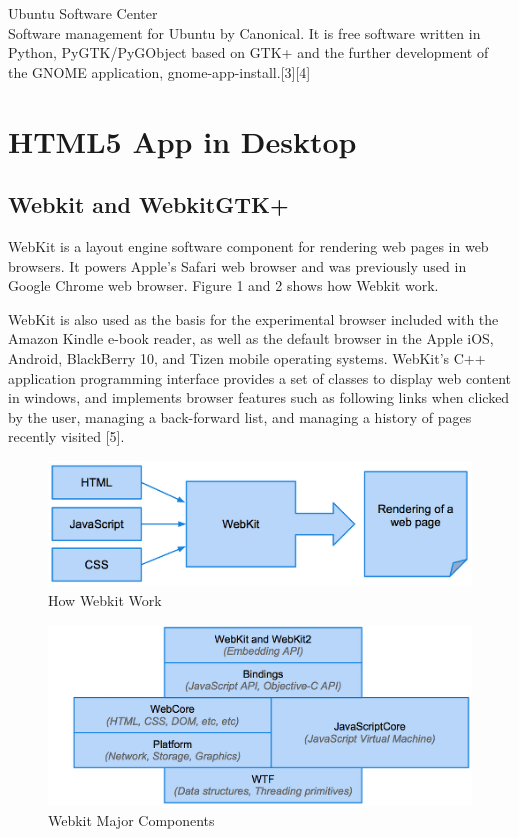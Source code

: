 \documentclass[conference, letterpaper]{IEEEtran}
\begin{document}
Ubuntu Software Center\\Software management for Ubuntu by Canonical. It is free software written in Python, PyGTK/PyGObject based on GTK+ and the further development of the GNOME application, gnome-app-install.[3][4]

\section{HTML5 App in Desktop}

\subsection{Webkit and WebkitGTK+}
WebKit is a layout engine software component for rendering web pages in web browsers. It powers Apple's Safari web browser and was previously used in Google Chrome web browser. Figure 1 and 2 shows how Webkit work.

WebKit is also used as the basis for the experimental browser included with the Amazon Kindle e-book reader, as well as the default browser in the Apple iOS, Android, BlackBerry 10, and Tizen mobile operating systems. WebKit's C++ application programming interface provides a set of classes to display web content in windows, and implements browser features such as following links when clicked by the user, managing a back-forward list, and managing a history of pages recently visited [5].

\begin{figure}[!t]
\centering
\includegraphics[scale=0.5]{image/webkit.png}
\caption{How Webkit Work}
\end{figure}

\begin{figure}[!t]
\centering
\includegraphics[scale=0.5]{image/webkitcomponents.png}
\caption{Webkit Major Components}
\end{figure}
\end{document}
